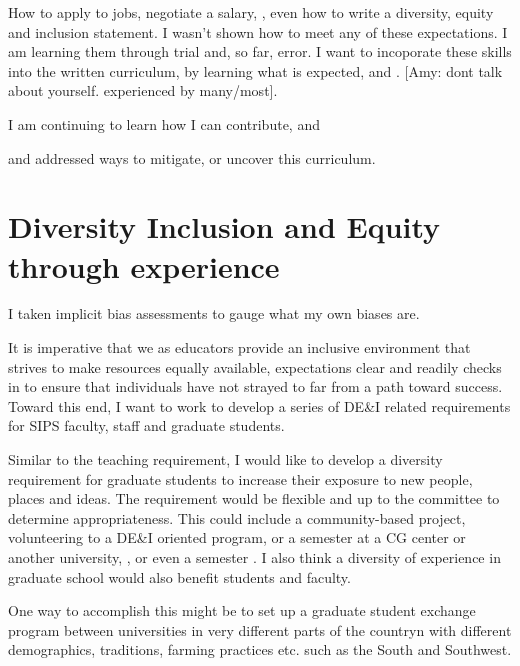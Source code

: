 \documentclass[11pt]{article}
\begin{document}
How to apply to jobs, negotiate a salary, , even how to write a diversity, equity and inclusion statement. I wasn't shown how to meet any of these expectations. I am learning them through trial and, so far, error. I want to incoporate these skills into the written curriculum, by learning what is expected, and . [Amy: dont talk about yourself. experienced by many/most]. 

 I am continuing to learn how I can contribute, and 

and addressed ways to mitigate, or uncover this curriculum.





\section{Diversity Inclusion and Equity through experience}

I taken implicit bias assessments to gauge what my own biases are.

It is imperative that we as educators provide an inclusive environment that strives to make resources equally available, expectations clear and readily checks in to ensure that individuals have not strayed to far from a path toward success. Toward this end, I want to work to develop a series of DE\&I related requirements for SIPS faculty, staff and graduate students. 

Similar to the teaching requirement, I would like to develop a diversity requirement for graduate students to increase their exposure to new people, places and ideas. The requirement would be flexible and up to the committee to determine appropriateness. This could include a community-based project, volunteering to a DE\&I oriented program, or a semester at a CG center or another university, , or even a semester . I also think a diversity of experience in graduate school would also benefit students and faculty. 


One way to accomplish this might be to set up a graduate student exchange program between universities in very different parts of the countryn with different demographics, traditions, farming practices etc. such as the South and Southwest. 
\end{document}
